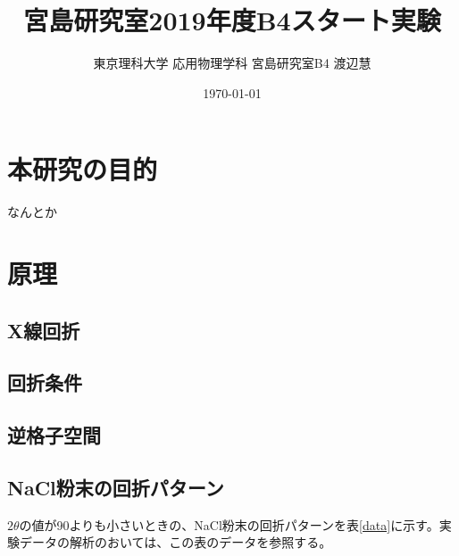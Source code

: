 \documentclass[11pt,a4j,uplatex]{jsarticle}
\title{宮島研究室2019年度B4スタート実験}
\author{東京理科大学 応用物理学科 宮島研究室B4 渡辺慧}
\date{\today}
\begin{document}
\maketitle %

\thispagestyle{empty}%
\clearpage
\addtocounter{page}{-1}%

\newpage

\tableofcontents %

\thispagestyle{empty}%
\clearpage
\addtocounter{page}{-1}


\newpage
\section{本研究の目的}
なんとか

\section{原理}
\subsection{X線回折}
\subsection{回折条件}
\subsection{逆格子空間}
\subsection{NaCl粉末の回折パターン}

$2\theta$の値が90よりも小さいときの、NaCl粉末の回折パターンを表\ref{data}に示す。実験データの解析のおいては、この表のデータを参照する。
\end{document}
